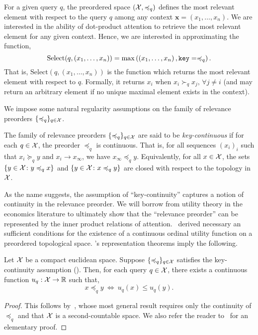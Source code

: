 For a given query $q$, the preordered space $({\mathcal{X}}, \preccurlyeq_q)$ defines the most relevant element with respect to the query $q$ among any context $\bm{x} = (x_1, \ldots, x_n)$. We are interested in the ability of dot-product attention to retrieve the most relevant element for any given context. Hence, we are interested in approximating the function,
\begin{equation}\label{eq:def_select}
    \mathrm{Select}(q, (x_1, \ldots, x_n)) = \max\paren{\paren{x_1, \ldots, x_n}, \mathtt{key}=\preceq_q}.
\end{equation}
That is, $\mathrm{Select}(q, (x_1, \ldots, x_n))$ is the function which returns the most relevant element with respect to $q$. Formally, it returns $x_i$ when $x_i \succ_q x_j, \, \forall j \neq i$ (and may return an arbitrary element if no unique maximal element exists in the context).

We impose some natural regularity assumptions on the family of relevance preorders $\{\preccurlyeq_q\}_{q \in {\mathcal{X}}}$.
\begin{assumption}\label{ass:key_cts}
    The family of relevance preorders $\{\preccurlyeq_q\}_{q \in {\mathcal{X}}}$ are said to be \textit{key-continuous} if for each $q \in {\mathcal{X}}$, the preorder $\preceq_q$ is continuous. That is, for all sequences $(x_i)_i$ such that $x_i \succeq_q y$ and $x_i \to x_\infty$, we have $x_\infty \preceq_q y$. Equivalently, for all $x \in {\mathcal{X}}$, the sets $\{y \in {\mathcal{X}} \colon y \preccurlyeq_q x\}$ and $\{y \in {\mathcal{X}} \colon x \preccurlyeq_q y\}$ are closed with respect to the topology in ${\mathcal{X}}$.
\end{assumption}

As the name suggests, the assumption of ``key-continuity'' captures a notion of continuity in the relevance preorder. We will borrow from utility theory in the economics literature to ultimately show that the ``relevance preorder'' can be represented by the inner product relations of attention.~\citet{debreuRepresentationPreferenceOrdering1954} derived necessary an sufficient conditions for the existence of a continuous ordinal utility function on a preordered topological space. 's representation theorems imply the following.

\begin{theorem*}
    Let ${\mathcal{X}}$ be a compact euclidean space. Suppose $\{\preccurlyeq_q\}_{q \in {\mathcal{X}}}$ satisfies the key-continuity assumption (). Then, for each query $q \in {\mathcal{X}}$, there exists a continuous function $u_q: {\mathcal{X}} \to \mathbb{R}$ such that,
    \begin{equation*}
        x \preceq_q y \ \iff \ u_q(x) \leq u_q(y).
    \end{equation*}
\end{theorem*}
\begin{proof}
    This follows by~\parencite{debreuRepresentationPreferenceOrdering1954}, whose most general result requires only the continuity of $\preceq_q$ and that ${\mathcal{X}}$ is a second-countable space. We also refer the reader to~\parencite{jaffrayExistenceContinuousUtility1975} for an elementary proof.
\end{proof}

